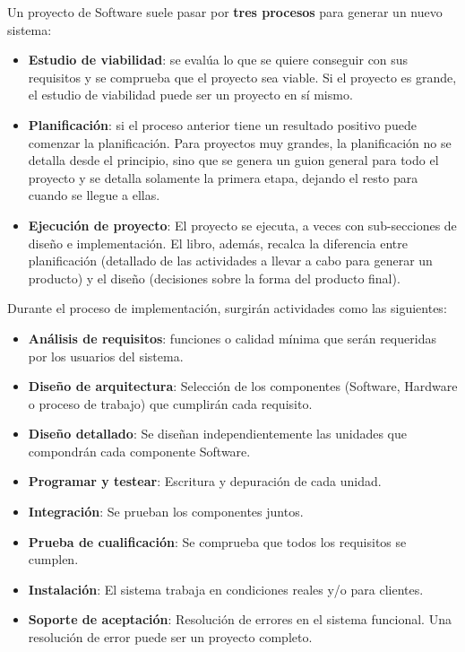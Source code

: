 \documentclass[12pt]{article}
\begin{document}
{Un proyecto de Software suele pasar por \textbf{tres procesos} para generar un nuevo sistema:}

\begin{itemize}
    \item {\textbf{Estudio de viabilidad}: se evalúa lo que se quiere conseguir con sus requisitos y se comprueba que el proyecto sea viable. Si el proyecto es grande, el estudio de viabilidad puede ser un proyecto en sí mismo.}
    \item {\textbf{Planificación}: si el proceso anterior tiene un resultado positivo puede comenzar la planificación. Para proyectos muy grandes, la planificación no se detalla desde el principio, sino que se genera un guion general para todo el proyecto y se detalla solamente la primera etapa, dejando el resto para cuando se llegue a ellas.}
    \item {\textbf{Ejecución de proyecto}: El proyecto se ejecuta, a veces con sub-secciones de diseño e implementación. El libro, además, recalca la diferencia entre planificación (detallado de las actividades a llevar a cabo para generar un producto) y el diseño (decisiones sobre la forma del producto final).}
\end{itemize}

{Durante el proceso de implementación, surgirán actividades como las siguientes:}

\begin{itemize}
    \item {\textbf{Análisis de requisitos}: funciones o calidad mínima que serán requeridas por los usuarios del sistema.}
    \item {\textbf{Diseño de arquitectura}: Selección de los componentes (Software, Hardware o proceso de trabajo) que cumplirán cada requisito.}
    \item {\textbf{Diseño detallado}: Se diseñan independientemente las unidades que compondrán cada componente Software.}
    \item {\textbf{Programar y testear}: Escritura y depuración de cada unidad.}
    \item {\textbf{Integración}: Se prueban los componentes juntos.}
    \item {\textbf{Prueba de cualificación}: Se comprueba que todos los requisitos se cumplen.}
    \item {\textbf{Instalación}: El sistema trabaja en condiciones reales y/o para clientes.}
    \item {\textbf{Soporte de aceptación}: Resolución de errores en el sistema funcional. Una resolución de error puede ser un proyecto completo.}
\end{itemize}
\end{document}
